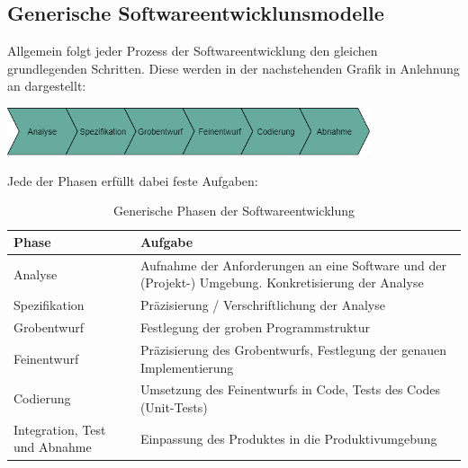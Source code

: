 \subsection{Generische Softwareentwicklunsmodelle}
\label{Generische Softwareentwicklunsmodelle}
Allgemein folgt jeder Prozess der Softwareentwicklung den gleichen grundlegenden Schritten. Diese werden in der nachstehenden Grafik in Anlehnung an \cite[Abb. 9.1]{Ludwig_Lichter_2013} dargestellt:

\begin{center}
    \includegraphics[width=0.8\textwidth]{Grafiken/GenerischeSchritteSoftwareentwicklung.png}
    \label{Grafik:Generische Schritte des Softwareentwicklungsprozesses}
\end{center}

Jede der Phasen erfüllt dabei feste Aufgaben:
    \begin{table}[!h]
        \centering
        \begin{tabular}{|p{4cm}|p{8cm}|}
            \hline
            Phase & Aufgabe\\
            \hline
            Analyse & Aufnahme der Anforderungen an eine Software und der (Projekt-) Umgebung. \glqq{}Konkretisierung der Analyse\grqq{} \cite[S. 155]{Ludwig_Lichter_2013}\\
            \hline
            Spezifikation & Präzisierung / Verschriftlichung der Analyse\\
            \hline
            Grobentwurf & Festlegung der groben Programmstruktur\\
            \hline
            Feinentwurf & Präzisierung des Grobentwurfs, Festlegung der genauen Implementierung\\
            \hline
            Codierung & Umsetzung des Feinentwurfs in Code, Tests des Codes (Unit-Tests)\\
            \hline
            Integration, Test und Abnahme & Einpassung des Produktes in die Produktivumgebung\\
            \hline
        \end{tabular}
            \caption{Generische Phasen der Softwareentwicklung}
            \label{Generische Phasen der Softwareentwicklung}
    \end{table}

